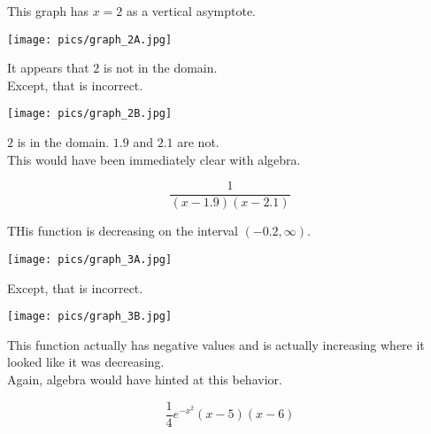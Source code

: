 \documentclass{ximera}
\begin{document}
\begin{example}


This graph has $x=2$ as a vertical asymptote.

\begin{image}
\texttt{[image: pics/graph\_2A.jpg]}
\end{image}

It appears that $2$ is not in the domain. \\


Except, that is incorrect.

\begin{image}
\texttt{[image: pics/graph\_2B.jpg]}
\end{image}


$2$ is in the domain. $1.9$ and $2.1$ are not. \\


This would have been immediately clear with algebra.

\[  \frac{1}{(x-1.9)(x-2.1)}     \]


\end{example}


















\begin{example}


THis function is decreasing on the interval $(-0.2, \infty)$.

\begin{image}
\texttt{[image: pics/graph\_3A.jpg]}
\end{image}




Except, that is incorrect.

\begin{image}
\texttt{[image: pics/graph\_3B.jpg]}
\end{image}


This function actually has negative values and is actually increasing where it looked like it was decreasing. \\


Again, algebra would have hinted at this behavior.

\[  \frac{1}{4} e^{-x^2} (x-5)(x-6)     \]


\end{example}
\end{document}
